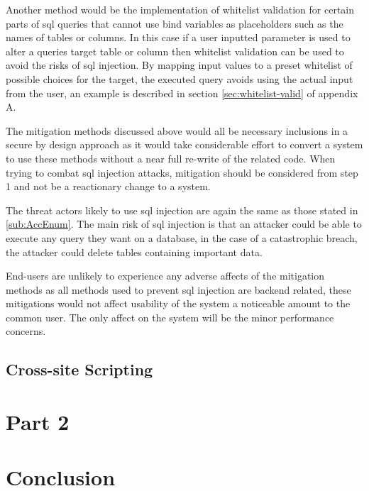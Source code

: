 \documentclass{ueacmpstyle}
\begin{document}
      Another method would be the implementation of whitelist validation for certain 
      parts of sql queries that cannot use bind variables as placeholders such as the 
      names of tables or columns. In this case if a user inputted parameter is used to 
      alter a queries target table or column then whitelist validation can be used to 
      avoid the risks of sql injection. By mapping input values to a preset whitelist 
      of possible choices for the target, the executed query avoids using the actual 
      input from the user, an example is described in section \ref{sec:whitelist-valid} 
      of appendix A.

      The mitigation methods discussed above would all be necessary inclusions in a 
      secure by design approach as it would take considerable effort to convert a system 
      to use these methods without a near full re-write of the related code. When trying 
      to combat sql injection attacks, mitigation should be considered from step 1 and not 
      be a reactionary change to a system.

      The threat actors likely to use sql injection are again the same as those stated 
      in \ref{sub:AccEnum}. The main risk of sql injection is that an attacker could be 
      able to execute any query they want on a database, in the case of a catastrophic 
      breach, the attacker could delete tables containing important data.

      End-users are unlikely to experience any adverse affects of the mitigation methods 
      as all methods used to prevent sql injection are backend related, these mitigations 
      would not affect usability of the system a noticeable amount to the common user. 
      The only affect on the system will be the minor performance concerns.

      \subsection{Cross-site Scripting}\label{sub:XSS}
      
        
    \section{Part 2}\label{sec:Pt2}


    \section{Conclusion}\label{sec:Con}
\end{document}
